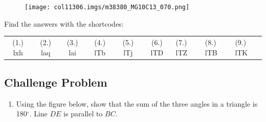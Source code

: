 \begin{table}[H]
\begin{enumerate}[noitemsep, label=\textbf{\arabic*}. ]
	\begin{figure}[H] %
    \begin{center}
    \label{m38380*id401236!!!underscore!!!media}\label{m38380*id401236!!!underscore!!!printimage}\texttt{[image: col11306.imgs/m38380\_MG10C13\_070.png]} %
        
      \vspace{2pt}
    \vspace{.1in}
    
    \end{center}

 \end{figure}   

    \addtocounter{footnote}{-0}
    
        
\end{enumerate}
        
      \label{m38380*uid132}
\par {} Find the answers with the shortcodes:
 \par \begin{tabular}[h]{cccccc}
 (1.) lxh  &  (2.) laq  &  (3.) lai  &  (4.) lTb  &  (5.) lTj  &  (6.) lTD  &  (7.) lTZ  &  (8.) lTB  &  (9.) lTK  & \end{tabular}

\pagebreak

        \subsection{ Challenge Problem}
        \nopagebreak
        
        
        \label{m38380*id320611}\begin{enumerate}[noitemsep, label=\textbf{\arabic*}. ] 
            \label{m38380*uid133}\item Using the figure below, show that the sum of the three angles in a triangle is 180\begin{math}{}^{\circ }\end{math}. Line \begin{math}DE\end{math}\hspace{1ex} is parallel to \begin{math}BC\end{math}.


\end{enumerate}
\end{table}
